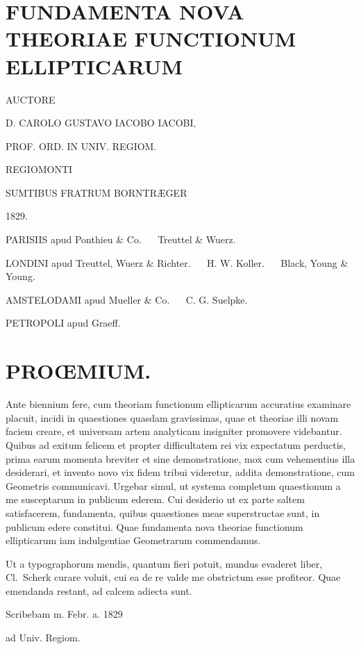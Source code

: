 \documentclass{article}
\begin{document}

\section*{FUNDAMENTA NOVA THEORIAE FUNCTIONUM ELLIPTICARUM}

AUCTORE

D. CAROLO GUSTAVO IACOBO IACOBI,

PROF. ORD. IN UNIV. REGIOM.

REGIOMONTI

SUMTIBUS FRATRUM BORNTRÆGER

1829.

PARISIIS apud Ponthieu \& Co. $\quad$ Treuttel \& Wuerz.

LONDINI apud Treuttel, Wuerz \& Richter. $\quad$ H. W. Koller. $\quad$ Black, Young \& Young.

AMSTELODAMI apud Mueller \& Co. $\quad$ C. G. Suelpke.

PETROPOLI apud Graeff.


\section*{PROŒMIUM.}

Ante biennium fere, cum theoriam functionum ellipticarum accuratius examinare placuit, incidi in quaestiones quasdam gravissimas, quae et theoriae illi novam faciem creare, et universam artem analyticam insigniter promovere videbantur. Quibus ad exitum felicem et propter difficultatem rei vix expectatum perductis, prima earum momenta breviter et sine demonstratione, mox cum vehementius illa desiderari, et invento novo vix fidem tribui videretur, addita demonstratione, cum Geometris communicavi. Urgebar simul, ut systema completum quaestionum a me susceptarum in publicum ederem. Cui desiderio ut ex parte saltem satisfacerem, fundamenta, quibus quaestiones meae superstructae sunt, in publicum edere constitui. Quae fundamenta nova theoriae functionum ellipticarum iam indulgentiae Geometrarum commendamus.


Ut a typographorum mendis, quantum fieri potuit, mundus evaderet liber, Cl.\ Scherk curare voluit, cui ea de re valde me obstrictum esse profiteor. Quae emendanda restant, ad calcem adiecta sunt.

Scribebam m. Febr. a. 1829

ad Univ. Regiom.
\end{document}
